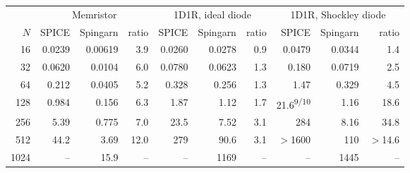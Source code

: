 \begin{tabular}{rrrrrrrrrr}
\toprule
 & \multicolumn{3}{c}{Memristor} & \multicolumn{3}{c}{1D1R, ideal diode} & \multicolumn{3}{c}{1D1R, Shockley diode} \\
\cmidrule(lr){2-4}\cmidrule(lr){5-7}\cmidrule(lr){8-10}
$N$ & SPICE & Spingarn & ratio & SPICE & Spingarn & ratio & SPICE & Spingarn & ratio \\
\midrule
16 & 0.0239 & 0.00619 & 3.9 & 0.0260 & 0.0278 & 0.9 & 0.0479 & 0.0344 & 1.4 \\
32 & 0.0620 & 0.0104 & 6.0 & 0.0780 & 0.0623 & 1.3 & 0.180 & 0.0719 & 2.5 \\
64 & 0.212 & 0.0405 & 5.2 & 0.328 & 0.256 & 1.3 & 1.47 & 0.329 & 4.5 \\
128 & 0.984 & 0.156 & 6.3 & 1.87 & 1.12 & 1.7 & 21.6\textsuperscript{9/10} & 1.16 & 18.6 \\
256 & 5.39 & 0.775 & 7.0 & 23.5 & 7.52 & 3.1 & 284 & 8.16 & 34.8 \\
512 & 44.2 & 3.69 & 12.0 & 279 & 90.6 & 3.1 & $>$1600 & 110 & $>$14.6 \\
1024 & -- & 15.9 & -- & -- & 1169 & -- & -- & 1445 & -- \\
\bottomrule
\end{tabular}
